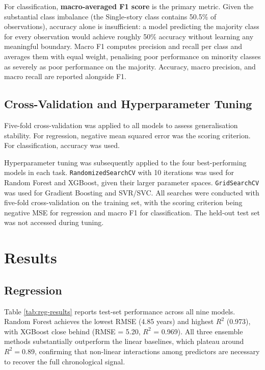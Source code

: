 \documentclass[11pt,a4paper]{article}
\let\oldsection\section
\renewcommand{\section}{\clearpage\oldsection}
\begin{document}
For classification, \textbf{macro-averaged F1 score} is the primary
metric. Given the substantial class imbalance (the Single-story class
contains 50.5\% of observations), accuracy alone is insufficient: a
model predicting the majority class for every observation would achieve
roughly 50\% accuracy without learning any meaningful boundary. Macro F1
computes precision and recall per class and averages them with equal
weight, penalising poor performance on minority classes as severely as
poor performance on the majority. Accuracy, macro precision, and macro
recall are reported alongside F1.

\subsection{Cross-Validation and Hyperparameter
Tuning}\label{cross-validation-and-hyperparameter-tuning}

Five-fold cross-validation was applied to all models to assess
generalisation stability. For regression, negative mean squared error
was the scoring criterion. For classification, accuracy was used.

Hyperparameter tuning was subsequently applied to the four
best-performing models in each task. \texttt{RandomizedSearchCV} with 10
iterations was used for Random Forest and XGBoost, given their larger
parameter spaces. \texttt{GridSearchCV} was used for Gradient Boosting
and SVR/SVC. All searches were conducted with five-fold cross-validation
on the training set, with the scoring criterion being negative MSE for
regression and macro F1 for classification. The held-out test set was
not accessed during tuning.

\section{Results}\label{results}

\subsection{Regression}\label{regression}

Table \ref{tab:reg-results} reports test-set performance across all nine
models. Random Forest achieves the lowest RMSE (4.85 years) and highest
\(R^2\) (0.973), with XGBoost close behind (RMSE = 5.20, \(R^2\) =
0.969). All three ensemble methods substantially outperform the linear
baselines, which plateau around \(R^2 = 0.89\), confirming that
non-linear interactions among predictors are necessary to recover the
full chronological signal.
\end{document}

